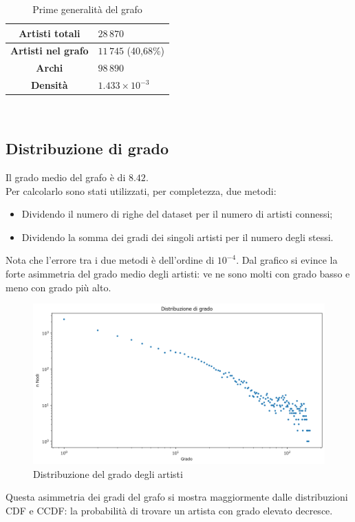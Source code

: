 \documentclass[sigchi]{acmart}
\begin{document}
\begin{table}[H]
\centering
\begin{tabular}{|c|>{\raggedright\arraybackslash}p{4cm}|}
\hline
\textbf{Artisti totali} &
$ 28\,870 $ \\
\hline
\textbf{Artisti nel grafo} &
$ 11\,745 $ (40,68\%)  \\
\hline
\textbf{Archi} &
$ 98\,890 $ \\
\hline
\textbf{Densità} &
$ 1.433 \times 10^{-3} $ \\
\hline
\end{tabular}\\[15pt]
\caption{Prime generalità del grafo}
\end{table}

\subsection{Distribuzione di grado}

Il grado medio del grafo è di $ 8.42 $. \\ Per calcolarlo sono stati utilizzati, per completezza, due metodi:

\begin{itemize}
\item Dividendo il numero di righe del dataset per il numero di artisti connessi;
\item Dividendo la somma dei gradi dei singoli artisti per il numero degli stessi.
\end{itemize}
Nota che l'errore tra i due metodi è dell'ordine di $ 10^{-4} $. Dal grafico si evince la forte asimmetria del grado medio degli artisti: ve ne sono molti con grado basso e meno con grado più alto.

\begin{figure}[H]
\centering
\includegraphics[width=0.45
\textwidth]{../network_analysis/plots/2_2/grDist.png}
\caption{Distribuzione del grado degli artisti}
\label{fig:grDist}
\end{figure}

\noindent Questa asimmetria dei gradi del grafo si mostra maggiormente dalle distribuzioni CDF e CCDF: la probabilità di trovare un artista con grado elevato decresce.
\end{document}
